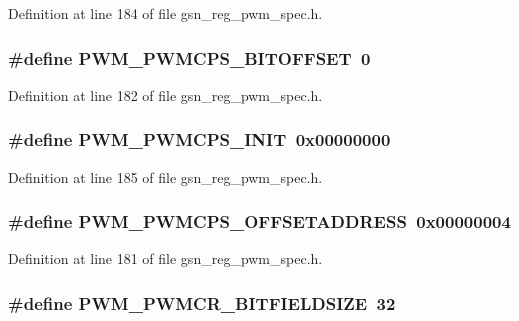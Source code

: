 Definition at line 184 of file gsn\_\-reg\_\-pwm\_\-spec.h.

\hypertarget{a00565_a6bede042f00b760aa67e03e55dab81c6}{
\subsubsection[{PWM\_\-PWMCPS\_\-BITOFFSET}]{\setlength{\rightskip}{0pt plus 5cm}\#define PWM\_\-PWMCPS\_\-BITOFFSET~0}}
\label{a00565_a6bede042f00b760aa67e03e55dab81c6}


Definition at line 182 of file gsn\_\-reg\_\-pwm\_\-spec.h.

\hypertarget{a00565_a8f654e6b58b75107e15f80a12ec97476}{
\subsubsection[{PWM\_\-PWMCPS\_\-INIT}]{\setlength{\rightskip}{0pt plus 5cm}\#define PWM\_\-PWMCPS\_\-INIT~0x00000000}}
\label{a00565_a8f654e6b58b75107e15f80a12ec97476}


Definition at line 185 of file gsn\_\-reg\_\-pwm\_\-spec.h.

\hypertarget{a00565_ae6722fb70732f8b8a2b53ce99e78a8b9}{
\subsubsection[{PWM\_\-PWMCPS\_\-OFFSETADDRESS}]{\setlength{\rightskip}{0pt plus 5cm}\#define PWM\_\-PWMCPS\_\-OFFSETADDRESS~0x00000004}}
\label{a00565_ae6722fb70732f8b8a2b53ce99e78a8b9}


Definition at line 181 of file gsn\_\-reg\_\-pwm\_\-spec.h.

\hypertarget{a00565_a1a7d20fb5029cfe68d3972c012f825ad}{
\subsubsection[{PWM\_\-PWMCR\_\-BITFIELDSIZE}]{\setlength{\rightskip}{0pt plus 5cm}\#define PWM\_\-PWMCR\_\-BITFIELDSIZE~32}}
\label{a00565_a1a7d20fb5029cfe68d3972c012f825ad}


